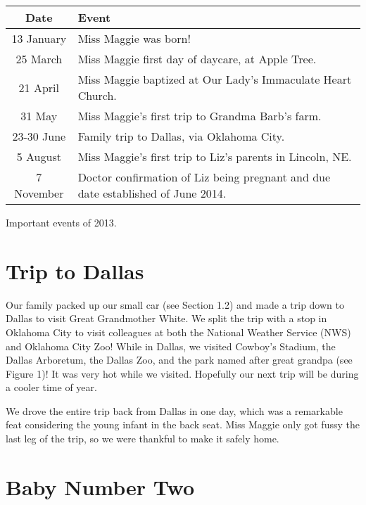 \documentclass{article}
\makeatletter
\newenvironment{tablehere}
  {\def\@captype{table}}
  {}
\makeatother
\begin{document}
\begin{multicols}{2}
\begin{tablehere}
 \begin{center}
  \begin{tabular}{|c|p{5cm}|}
   \multicolumn{1}{c}{Date} &
   \multicolumn{1}{l}{Event} \\ \hline \hline
   13 January     & Miss Maggie was born! \\
   25 March       & Miss Maggie first day of daycare, at Apple Tree. \\
   21 April       & Miss Maggie baptized at Our Lady's Immaculate Heart Church. \\
   31 May         & Miss Maggie's first trip to Grandma Barb's farm. \\
   23-30 June     & Family trip to Dallas, via Oklahoma City. \\
   5 August       & Miss Maggie's first trip to Liz's parents in Lincoln, NE. \\
   7 November     & Doctor confirmation of Liz being pregnant and due date established of June 2014. \\
\hline 
  \end{tabular}
 \end{center}
 \caption{Important events of 2013.}
 \label{table:timeline}
\end{tablehere}

\section{Trip to Dallas}

Our family packed up our small car (see Section 1.2) and made a trip down to Dallas to visit 
Great Grandmother White.  We split the trip with a stop in Oklahoma City to
visit colleagues at both the National Weather Service (NWS) and Oklahoma City Zoo!
While in Dallas, we visited Cowboy's Stadium, the Dallas Arboretum, the 
Dallas Zoo, and the park named after great grandpa (see Figure 1)!  It was very hot while we visited.
Hopefully our next trip will be during a cooler time of year.

We drove the entire trip back from Dallas in one day, which was a remarkable
feat considering the young infant in the back seat. Miss Maggie only got fussy
the last leg of the trip, so we were thankful to make it safely home.

\bigskip


\section{Baby Number Two}


\end{multicols}
\end{document}

